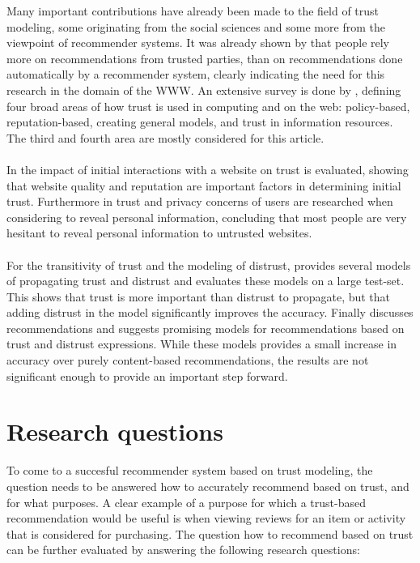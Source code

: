 \documentclass{llncs}
\begin{document}
Many important contributions have already been made to the field of trust modeling, some originating from the social sciences and some more from the viewpoint of recommender systems. It was already shown by \cite{Sinha2001} that people rely more on recommendations from trusted parties, than on recommendations done automatically by a recommender system, clearly indicating the need for this research in the domain of the WWW. An extensive survey is done by \cite{Artz2007}, defining four broad areas of how trust is used in computing and on the web: policy-based, reputation-based, creating general models, and trust in information resources. The third and fourth area are mostly considered for this article.\\
\\
In \cite{HarrisonMcKnight2002} the impact of initial interactions with a website on trust is evaluated, showing that website quality and reputation are important factors in determining initial trust. Furthermore in \cite{Hoebel2011} trust and privacy concerns of users are researched when considering to reveal personal information, concluding that most people are very hesitant to reveal personal information to untrusted websites.\\
\\
For the transitivity of trust and the modeling of distrust, \cite{Guha2004} provides several models of propagating trust and distrust and evaluates these models on a large test-set. This shows that trust is more important than distrust to propagate, but that adding distrust in the model significantly improves the accuracy. Finally \cite{Victor2011} discusses recommendations and suggests promising models for recommendations based on trust and distrust expressions. While these models provides a small increase in accuracy over purely content-based recommendations, the results are not significant enough to provide an important step forward.


\section{Research questions}

To come to a succesful recommender system based on trust modeling, the question needs to be answered how to accurately recommend based on trust, and for what purposes. A clear example of a purpose for which a trust-based recommendation would be useful is when viewing reviews for an item or activity that is considered for purchasing. The question how to recommend based on trust can be further evaluated by answering the following research questions:
\end{document}
